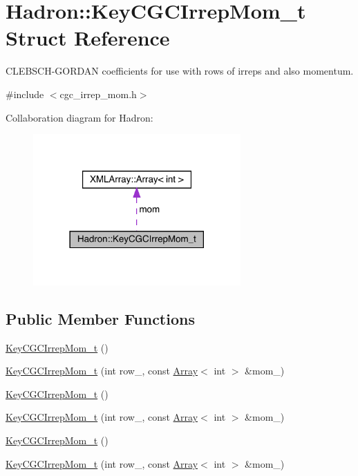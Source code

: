\hypertarget{structHadron_1_1KeyCGCIrrepMom__t}{}\section{Hadron\+:\+:Key\+C\+G\+C\+Irrep\+Mom\+\_\+t Struct Reference}
\label{structHadron_1_1KeyCGCIrrepMom__t}


C\+L\+E\+B\+S\+C\+H-\/\+G\+O\+R\+D\+AN coefficients for use with rows of irreps and also momentum.  




{\ttfamily \#include $<$cgc\+\_\+irrep\+\_\+mom.\+h$>$}



Collaboration diagram for Hadron\+:\nopagebreak
\begin{figure}[H]
\begin{center}
\leavevmode
\includegraphics[width=225pt]{da/d01/structHadron_1_1KeyCGCIrrepMom__t__coll__graph}
\end{center}
\end{figure}
\subsection*{Public Member Functions}
\begin{DoxyCompactItemize}
\item 
\mbox{\hyperlink{structHadron_1_1KeyCGCIrrepMom__t_aa3965e02d80a6c483de3e253a4de7826}{Key\+C\+G\+C\+Irrep\+Mom\+\_\+t}} ()
\item 
\mbox{\hyperlink{structHadron_1_1KeyCGCIrrepMom__t_a467e3ce4ab08bc6438ac855240bead31}{Key\+C\+G\+C\+Irrep\+Mom\+\_\+t}} (int row\+\_\+, const \mbox{\hyperlink{classXMLArray_1_1Array}{Array}}$<$ int $>$ \&mom\+\_\+)
\item 
\mbox{\hyperlink{structHadron_1_1KeyCGCIrrepMom__t_aa3965e02d80a6c483de3e253a4de7826}{Key\+C\+G\+C\+Irrep\+Mom\+\_\+t}} ()
\item 
\mbox{\hyperlink{structHadron_1_1KeyCGCIrrepMom__t_a467e3ce4ab08bc6438ac855240bead31}{Key\+C\+G\+C\+Irrep\+Mom\+\_\+t}} (int row\+\_\+, const \mbox{\hyperlink{classXMLArray_1_1Array}{Array}}$<$ int $>$ \&mom\+\_\+)
\item 
\mbox{\hyperlink{structHadron_1_1KeyCGCIrrepMom__t_aa3965e02d80a6c483de3e253a4de7826}{Key\+C\+G\+C\+Irrep\+Mom\+\_\+t}} ()
\item 
\mbox{\hyperlink{structHadron_1_1KeyCGCIrrepMom__t_a467e3ce4ab08bc6438ac855240bead31}{Key\+C\+G\+C\+Irrep\+Mom\+\_\+t}} (int row\+\_\+, const \mbox{\hyperlink{classXMLArray_1_1Array}{Array}}$<$ int $>$ \&mom\+\_\+)
\end{DoxyCompactItemize}
